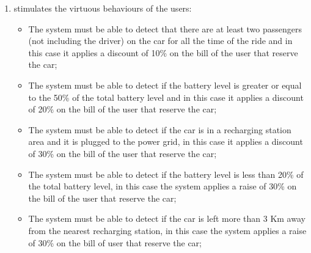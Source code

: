 \begin{enumerate}
\item stimulates the virtuous behaviours of the users:

\begin{itemize}
	\item The system must be able to detect that there are at least two passengers (not including the driver) on the car for all the time of the ride and in this case it applies a discount of 10\% on the bill of the user that reserve the car;
	\item The system must be able to detect if  the battery level is greater or equal to the 50\% of the total battery level and in this case it applies a discount of 20\% on the bill of the user that reserve the car;
	\item The system must be able to detect if the car is in a recharging station area and it is plugged to the power grid, in this case it applies a discount of 30\% on the bill of the user that reserve the car;
	\item The system must be able to detect if the battery level is less than 20\% of the total battery level, in this case the system applies a raise of 30\% on the bill of the user that reserve the car;
	\item The system must be able to detect if the car is left more than 3 Km away from the nearest recharging station, in this case the system applies a raise of 30\% on the bill of user that reserve the car;
\end{itemize}

\end{enumerate}